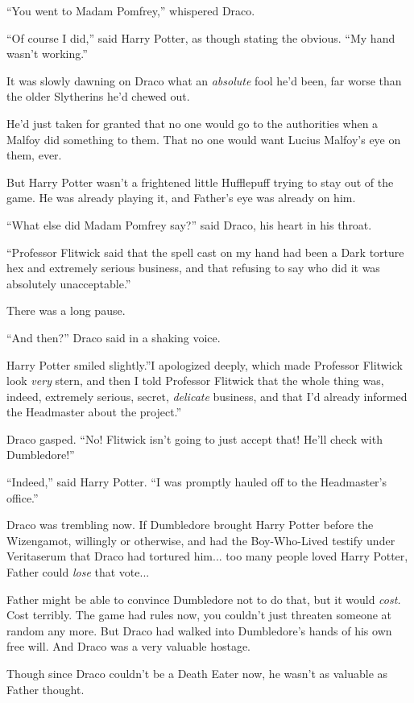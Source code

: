 ``You went to Madam Pomfrey,'' whispered Draco.

``Of course I did,'' said Harry Potter, as though stating the obvious.
``My hand wasn't working.''

It was slowly dawning on Draco what an \emph{absolute} fool he'd been,
far worse than the older Slytherins he'd chewed out.

He'd just taken for granted that no one would go to the authorities when
a Malfoy did something to them. That no one would want Lucius Malfoy's
eye on them, ever.

But Harry Potter wasn't a frightened little Hufflepuff trying to stay
out of the game. He was already playing it, and Father's eye was already
on him.

``What else did Madam Pomfrey say?'' said Draco, his heart in his
throat.

``Professor Flitwick said that the spell cast on my hand had been a Dark
torture hex and extremely serious business, and that refusing to say who
did it was absolutely unacceptable.''

There was a long pause.

``And then?'' Draco said in a shaking voice.

Harry Potter smiled slightly.''I apologized deeply, which made Professor
Flitwick look \emph{very} stern, and then I told Professor Flitwick that
the whole thing was, indeed, extremely serious, secret, \emph{delicate}
business, and that I'd already informed the Headmaster about the
project.''

Draco gasped. ``No! Flitwick isn't going to just accept that! He'll
check with Dumbledore!''

``Indeed,'' said Harry Potter. ``I was promptly hauled off to the
Headmaster's office.''

Draco was trembling now. If Dumbledore brought Harry Potter before the
Wizengamot, willingly or otherwise, and had the Boy-Who-Lived testify
under Veritaserum that Draco had tortured him... too many people
loved Harry Potter, Father could \emph{lose} that vote...

Father might be able to convince Dumbledore not to do that, but it would
\emph{cost.} Cost terribly. The game had rules now, you couldn't just
threaten someone at random any more. But Draco had walked into
Dumbledore's hands of his own free will. And Draco was a very valuable
hostage.

Though since Draco couldn't be a Death Eater now, he wasn't as valuable
as Father thought.

